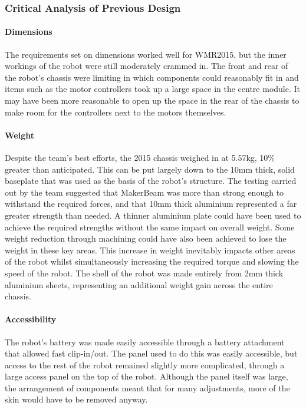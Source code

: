 \subsubsection{Critical Analysis of Previous Design}
\paragraph{Dimensions}
The requirements set on dimensions worked well for WMR2015, but the inner workings of the robot were still moderately crammed in. The front and rear of the robot’s chassis were limiting in which components could reasonably fit in and items such as the motor controllers took up a large space in the centre module. It may have been more reasonable to open up the space in the rear of the chassis to make room for the controllers next to the motors themselves.
\paragraph{Weight}
Despite the team’s best efforts, the 2015 chassis weighed in at 5.57kg, 10\% greater than anticipated. This can be put largely down to the 10mm thick, solid baseplate that was used as the basis of the robot’s structure. The testing carried out by the team suggested that MakerBeam\textsuperscript{\textregistered} was more than strong enough to withstand the required forces, and that 10mm thick aluminium represented a far greater strength than needed. A thinner aluminium plate could have been used to achieve the required strengths without the same impact on overall weight. Some weight reduction through machining could have also been achieved to lose the weight in these key areas. This increase in weight inevitably impacts other areas of the robot whilst simultaneously increasing the required torque and slowing the speed of the robot. The shell of the robot was made entirely from 2mm thick aluminium sheets, representing an additional weight gain across the entire chassis.
\paragraph{Accessibility}
The robot’s battery was made easily accessible through a battery attachment that allowed fast clip-in/out. The panel used to do this was easily accessible, but access to the rest of the robot remained slightly more complicated, through a large access panel on the top of the robot. Although the panel itself was large, the arrangement of components meant that for many adjustments, more of the skin would have to be removed anyway.
